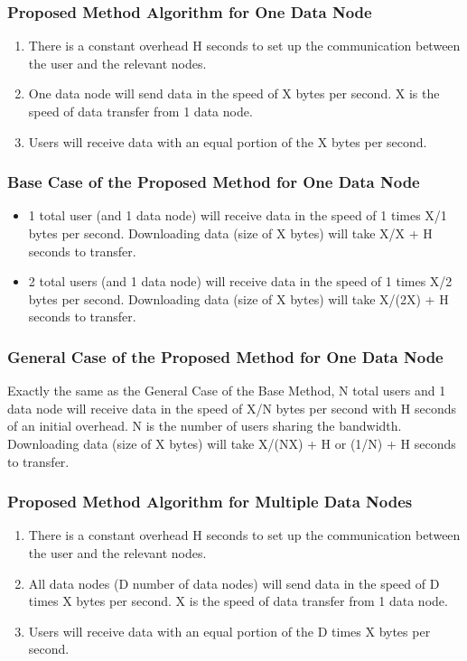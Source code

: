\documentclass[acmsmall]{acmart}
\begin{document}
\subsubsection{Proposed Method Algorithm for One Data Node}

\begin{enumerate}
    \item There is a constant overhead H seconds to set up the communication between the user and the relevant nodes.
    \item One data node will send data in the speed of X bytes per second. X is the speed of data transfer from 1 data node.
    \item Users will receive data with an equal portion of the X bytes per second. 
\end{enumerate}

\subsubsection{Base Case of the Proposed Method for One Data Node}

\begin{itemize} 
    \item 1 total user (and 1 data node) will receive data in the speed of 1 times X/1 bytes per second. Downloading data (size of X bytes) will take X/X + H seconds to transfer.
    \item 2 total users (and 1 data node) will receive data in the speed of 1 times X/2 bytes per second. Downloading data (size of X bytes) will take X/(2X) + H seconds to transfer.
\end{itemize}


\subsubsection{General Case of the Proposed Method for One Data Node} 
Exactly the same as the  General Case of the Base Method, N total users and 1 data node will receive data in the speed of X/N bytes per second with H seconds of an initial overhead. N is the number of users sharing the bandwidth. Downloading data (size of X bytes)  will take X/(NX) + H or (1/N) + H seconds to transfer.

\subsubsection{Proposed Method Algorithm for Multiple Data Nodes}
\begin{enumerate}
    \item There is a constant overhead H seconds to set up the communication between the user and the relevant nodes.
    \item All data nodes (D number of data nodes) will send data in the speed of D times X bytes per second. X is the speed of data transfer from 1 data node.
    \item Users will receive data with an equal portion of the D times X bytes per second.
\end{enumerate}
\end{document}
